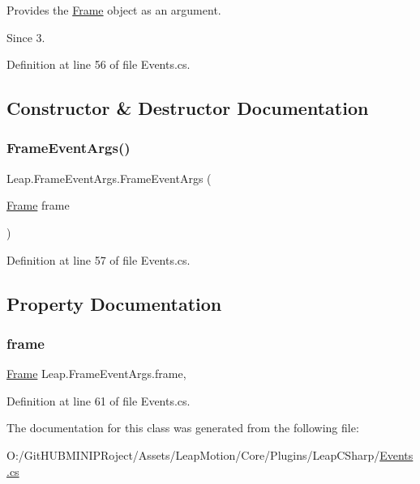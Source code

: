 Provides the \mbox{\hyperlink{class_leap_1_1_frame}{Frame}} object as an argument. \begin{DoxySince}{Since}
3. 
\end{DoxySince}


Definition at line 56 of file Events.\+cs.



\subsection{Constructor \& Destructor Documentation}
\mbox{\label{class_leap_1_1_frame_event_args_a53a90b533be3c20eaa86db4dacb61ddd}} 
\subsubsection{\texorpdfstring{FrameEventArgs()}{FrameEventArgs()}}
{\footnotesize\ttfamily Leap.\+Frame\+Event\+Args.\+Frame\+Event\+Args (\begin{DoxyParamCaption}\item[{\mbox{\hyperlink{class_leap_1_1_frame}{Frame}}}]{frame }\end{DoxyParamCaption})}



Definition at line 57 of file Events.\+cs.



\subsection{Property Documentation}
\mbox{\label{class_leap_1_1_frame_event_args_a5309519057d70f09b7ba3b9aff9510c6}} 
\subsubsection{\texorpdfstring{frame}{frame}}
{\footnotesize\ttfamily \mbox{\hyperlink{class_leap_1_1_frame}{Frame}} Leap.\+Frame\+Event\+Args.\+frame\hspace{0.3cm}{\ttfamily [get]}, {\ttfamily [set]}}



Definition at line 61 of file Events.\+cs.



The documentation for this class was generated from the following file\+:\begin{DoxyCompactItemize}
\item 
O\+:/\+Git\+H\+U\+B\+M\+I\+N\+I\+P\+Roject/\+Assets/\+Leap\+Motion/\+Core/\+Plugins/\+Leap\+C\+Sharp/\mbox{\hyperlink{_events_8cs}{Events.\+cs}}\end{DoxyCompactItemize}
